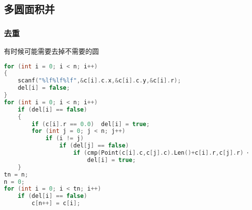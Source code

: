 \subsection{多圆面积并}
    \subsubsection{去重}
	有时候可能需要去掉不需要的圆
	\begin{lstlisting}[language=c++]
for (int i = 0; i < n; i++)
{
    scanf("%lf%lf%lf",&c[i].c.x,&c[i].c.y,&c[i].r);
    del[i] = false;
}
for (int i = 0; i < n; i++)
    if (del[i] == false)
    {
        if (c[i].r == 0.0)  del[i] = true;
        for (int j = 0; j < n; j++)
            if (i != j)
                if (del[j] == false)
                    if (cmp(Point(c[i].c,c[j].c).Len()+c[i].r,c[j].r) <= 0)
                        del[i] = true;
    }
tn = n;
n = 0;
for (int i = 0; i < tn; i++)
    if (del[i] == false)
        c[n++] = c[i];
	\end{lstlisting}
	
